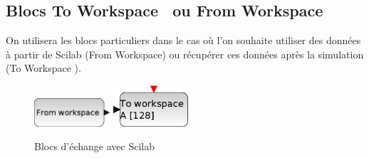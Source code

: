 \subsection{Blocs \og To Workspace \fg~ou \og From Workspace\fg}

On utilisera les blocs particuliers dans le cas où l'on souhaite 
utiliser des données à partir de Scilab (\og From Workspace\fg) 
ou récupérer ces données après la simulation (\og To Workspace \fg).

\begin{figure}[!h]
    \centering
    \includegraphics[width=0.25\textwidth]{fig/FROMWSB.eps}\hspace{3cm}
    \includegraphics[width=0.25\textwidth]{fig/TOWS_c.eps}
    \caption{Blocs d'échange avec Scilab\label{fig-workspace}}
\end{figure}




